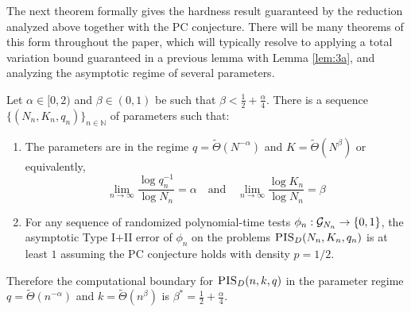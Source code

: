 The next theorem formally gives the hardness result guaranteed by the reduction analyzed above together with the PC conjecture. There will be many theorems of this form throughout the paper, which will typically resolve to applying a total variation bound guaranteed in a previous lemma with Lemma \ref{lem:3a}, and analyzing the asymptotic regime of several parameters.

\begin{theorem} \label{lem:4c}
Let $\alpha \in [0, 2)$ and $\beta \in (0, 1)$ be such that $\beta < \frac{1}{2} + \frac{\alpha}{4}$. There is a sequence $\{ (N_n, K_n, q_n) \}_{n \in \mathbb{N}}$ of parameters such that:
\begin{enumerate}
\item The parameters are in the regime $q = \tilde{\Theta}(N^{-\alpha})$ and $K = \tilde{\Theta}(N^\beta)$ or equivalently,
$$\lim_{n \to \infty} \frac{\log q_n^{-1}}{\log N_n} = \alpha \quad \text{and} \quad \lim_{n \to \infty} \frac{\log K_n}{\log N_n} = \beta$$
\item For any sequence of randomized polynomial-time tests $\phi_n : \mathcal{G}_{N_n} \to \{0, 1\}$, the asymptotic Type I$+$II error of $\phi_n$ on the problems $\textsc{PIS}_D(N_n, K_n, q_n)$ is at least $1$ assuming the PC conjecture holds with density $p = 1/2$.
\end{enumerate}
Therefore the computational boundary for $\textsc{PIS}_D(n, k, q)$ in the parameter regime $q = \tilde{\Theta}(n^{-\alpha})$ and $k = \tilde{\Theta}(n^\beta)$ is $\beta^* = \frac{1}{2} + \frac{\alpha}{4}$.
\end{theorem}

